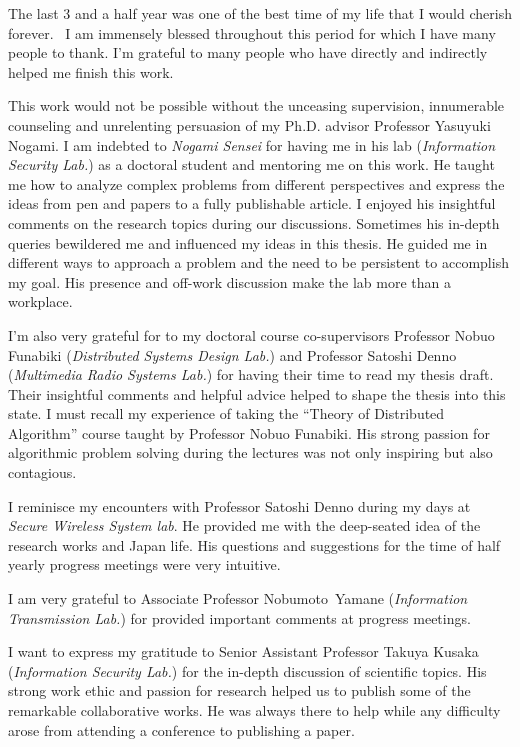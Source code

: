 The last 3 and a half year was one of the best time of my life that I would cherish forever. 
I am immensely blessed throughout this period for which I have many people to thank.
I'm grateful to many people who have directly and indirectly helped me finish this work.


This work would not be possible without the unceasing supervision, innumerable counseling and unrelenting persuasion of my Ph.D. advisor Professor Yasuyuki Nogami.
I am indebted to \textit{Nogami Sensei} for having me in his lab (\textit{Information Security Lab.}) as a doctoral student and mentoring me on this work.
He taught me how to analyze complex problems from different perspectives and express the ideas from pen and papers to a fully publishable article.
I enjoyed his insightful comments on the research topics during our discussions.
Sometimes his in-depth queries bewildered me and influenced my ideas in this thesis.
He guided me in different ways to approach a problem and the need to be persistent to accomplish my goal.
His presence and off-work discussion make the lab more than a workplace. 


I’m also very grateful for to my doctoral course co-supervisors Professor Nobuo Funabiki (\textit{Distributed Systems Design Lab.}) and Professor Satoshi Denno (\textit{Multimedia Radio Systems Lab.}) for having their time to read my thesis draft.
Their insightful comments and helpful advice helped to shape the thesis into this state.
I must recall my experience of taking the “Theory of Distributed Algorithm” course taught by Professor Nobuo Funabiki.
His strong passion for algorithmic problem solving during the lectures was not only inspiring but also contagious. 


I reminisce my encounters with Professor Satoshi Denno during my days at \textit{Secure Wireless System lab}.
He provided me with the deep-seated idea of the research works and Japan life.
His questions and suggestions for the time of half yearly progress meetings were very intuitive. 


I am very grateful to Associate Professor \mbox{Nobumoto Yamane} (\textit{Information Transmission Lab.}) for provided important comments at progress meetings.


I want to express my gratitude to Senior Assistant Professor Takuya Kusaka (\textit{Information Security Lab.}) for the in-depth discussion of scientific topics.
His strong work ethic and passion for research helped us to publish some of the remarkable collaborative works. 
He was always there to help while any difficulty arose from attending a conference to publishing a paper.  


